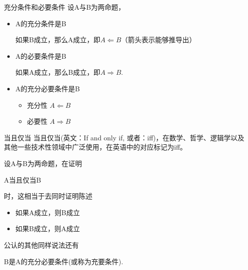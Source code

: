 \documentclass[13pt]{beamer}
\begin{document}
\begin{frame}{充分条件和必要条件}
设A与B为两命题，
\begin{itemize}
	\item A的\alert{充分条件}是B
	
	如果B成立，那么A成立，即$A\Leftarrow B$（箭头表示能够推导出）
	
	\item A的\alert{必要条件}是B
	
	如果A成立，那么B成立，即$A\Rightarrow B$.
	
	\item A的\alert{充分必要条件}是B
	\begin{itemize}
		\item 充分性 $A\Leftarrow B$
		\item 必要性 $A\Rightarrow B$
	\end{itemize}
	
\end{itemize}


\end{frame}
\begin{frame}{当且仅当}
当且仅当(英文：If and only if, 或者：iff)，在数学、哲学、逻辑学以及其他一些技术性领域中广泛使用，在英语中的对应标记为iff。

设A与B为两命题，在证明
\begin{center}
A当且仅当B
\end{center}
时，这相当于去同时证明陈述
\begin{itemize}
\item 如果A成立，则B成立
\item 如果B成立，则A成立
\end{itemize}



公认的其他同样说法还有
\begin{center}
B是A的充分必要条件(或称为充要条件).
\end{center}
%
%
%
%

\end{frame}
\end{document}
